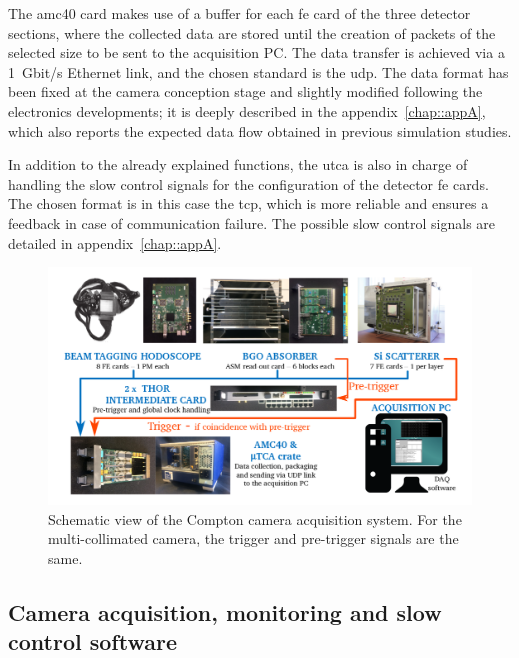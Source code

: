 The \gls{amc}40 card makes use of a buffer for each \gls{fe} card of the three detector sections, where the collected data are stored until the creation of packets of the selected size to be sent to the acquisition PC. The data transfer is achieved via a 1~Gbit/s Ethernet link, and the chosen standard is the \gls{udp}. The data format has been fixed at the camera conception stage and slightly modified following the electronics developments; it is deeply described in the appendix~\ref{chap::appA}, which also reports the expected data flow obtained in previous simulation studies.
  
In addition to the already explained functions, the \gls{utca} is also in charge of handling the slow control signals for the configuration of the detector \gls{fe} cards. The chosen format is in this case the \gls{tcp}, which is more reliable and ensures a feedback in case of communication failure. The possible slow control signals are detailed in appendix~\ref{chap::appA}.

\begin{figure}[!htbp]
\centering
\includegraphics[width=\textwidth]{03_GraphicFiles/chapter3_CLaRySproto/Electronics_Acquisition/daq_scheme.png}
\caption{Schematic view of the Compton camera acquisition system. For the multi-collimated camera, the trigger and pre-trigger signals are the same.}
\label{chap3::fig::DAQscheme}
\end{figure}


\subsection{Camera acquisition, monitoring and slow control software}\label{chap3::subsec::cameraSoftware}

